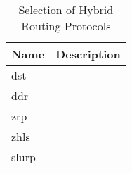 
\begin{table}\centering
  \caption[Selection of Hybrid Routing Protocols]{Selection of Hybrid Routing Protocols}
  \label{tab:hybrid_routing_protocols}
  \begin{tabularx}{\textwidth}{p{1.25cm}|X}\toprule
    Name & Description \\ \midrule
    \gls{dst} & \\
    \gls{ddr} & \\
    \gls{zrp} & \\
    \gls{zhls} & \\
    \gls{slurp} & \\
    
    \bottomrule
  \end{tabularx}
\end{table}


